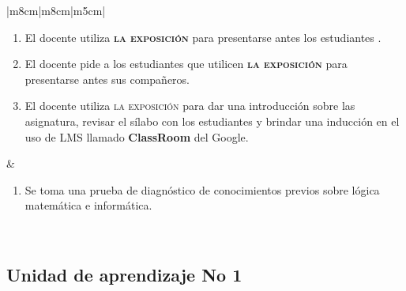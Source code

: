 \documentclass[a4paper,12pt,spanish]{article}
\begin{document}
\begin{tabular}[H]{|m{8cm}|m{8cm}|m{5cm}|}
\begin{minipage}[H]{1.0\linewidth}
{\begin{enumerate}
    \item El docente utiliza \textbf{\textsc{la exposición}} para presentarse antes los estudiantes . \vspace{0.5cm} 
    \item El docente pide a los estudiantes que utilicen \textbf{\textsc{la exposición}} para presentarse antes sus compañeros. \vspace{0.5cm}
    \item El docente utiliza \textsc{la exposición} para dar una introducción sobre las asignatura, revisar  el sílabo con los estudiantes y brindar una inducción en el uso de LMS llamado \textbf{ClassRoom} del Google.
    \end{enumerate}}
  \vspace{0.2cm}
  \end{minipage}

                     &
  \begin{minipage}[H]{1.0\linewidth}
    {\setlength{\leftmargini}{10pt}
    \begin{enumerate}

    \item Se toma una prueba de diagnóstico de conocimientos previos sobre lógica matemática e informática. \vspace{0.5cm} 

    \end{enumerate}}
  \vspace{0.2cm}
  \end{minipage}


  \\ \hline

\end{tabular}

\newpage
\subsection{Unidad de aprendizaje No 1}
\label{sec:unid-de-aprend1}
\end{document}
